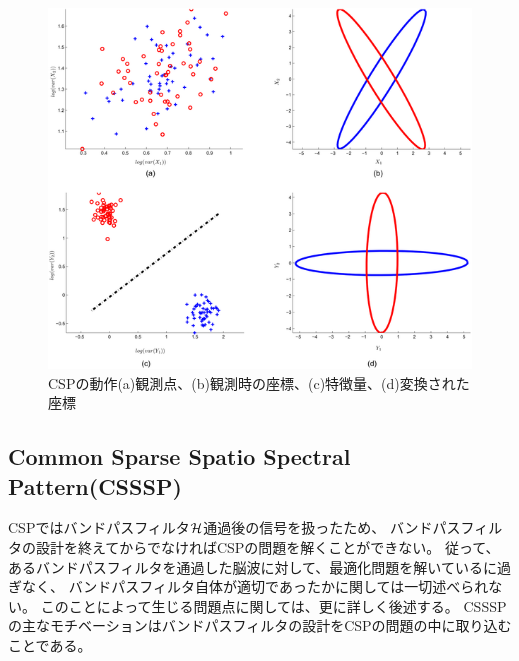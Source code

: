 \begin{figure}
    \centering
    \includegraphics[width=14cm]{images/apple.png}
    \caption{CSPの動作(a)観測点、(b)観測時の座標、(c)特徴量、(d)変換された座標}
    \label{fig:apple}
\end{figure}
  

\subsection{\rm Common Sparse Spatio Spectral Pattern(CSSSP)}
CSPではバンドパスフィルタ\(\cal H\)通過後の信号を扱ったため、
バンドパスフィルタの設計を終えてからでなければCSPの問題を解くことができない。
従って、あるバンドパスフィルタを通過した脳波に対して、最適化問題を解いているに過ぎなく、
バンドパスフィルタ自体が適切であったかに関しては一切述べられない。
このことによって生じる問題点に関しては、更に詳しく後述する。
CSSSPの主なモチベーションはバンドパスフィルタの設計をCSPの問題の中に取り込むことである\cite{csssp}。

